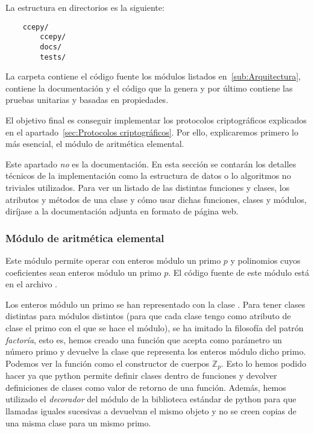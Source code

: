 La estructura en directorios es la siguiente:
\begin{verbatim}
    ccepy/
        ccepy/
        docs/
        tests/
\end{verbatim}
La carpeta  contiene el código fuente los módulos listados en~\ref{sub:Arquitectura},  contiene la documentación y el código que la genera y por último  contiene las pruebas unitarias y basadas en propiedades.

El objetivo final es conseguir implementar los protocolos criptográficos explicados en el apartado~\ref{sec:Protocolos criptográficos}. Por ello, explicaremos primero lo más esencial, el módulo de aritmética elemental.

\begin{nota}
    Este apartado \emph{no} es la documentación. En esta sección se contarán los detalles técnicos de la implementación como la estructura de datos o lo algoritmos no triviales utilizados. Para ver un listado de las distintas funciones y clases, los atributos y métodos de una clase y cómo usar dichas funciones, clases y módulos, diríjase a la documentación adjunta en formato de página web.
\end{nota}

\subsubsection{Módulo de aritmética elemental}
\label{subs:Módulo de aritmética elemental}

Este módulo permite operar con enteros módulo un primo $p$ y polinomios
cuyos coeficientes sean enteros módulo un primo $p$. El código fuente de este módulo está en el archivo .

Los enteros módulo un primo se han representado con la clase . Para tener clases distintas para módulos distintos (para que cada clase tengo como atributo de clase el primo con el que se hace el módulo), se ha imitado la filosofía del patrón \emph{factoría}, esto es, hemos creado una función  que acepta como parámetro un número primo y devuelve la clase que representa los enteros módulo dicho primo. Podemos ver la función  como el constructor de cuerpos $\mathbb{Z}_p$. Esto lo hemos podido hacer ya que python permite definir clases dentro de funciones y devolver definiciones de clases como valor de retorno de una función. Además, hemos utilizado el \emph{decorador}  del módulo  de la biblioteca estándar de python para que llamadas iguales sucesivas a  devuelvan el mismo objeto y no se creen copias de una misma clase para un mismo primo.

